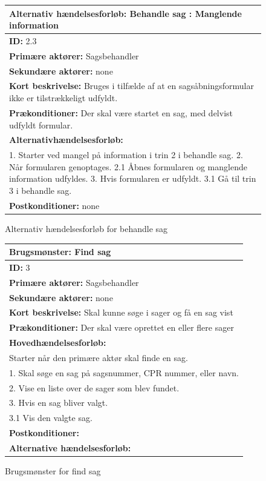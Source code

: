 \begin{figure} [htb!]
\begin{longtable}{|p{18cm}|}
\hline
\textbf{Alternativ hændelsesforløb:} Behandle sag : Manglende information\\
\hline
\textbf{ID:} 2.3 \\
\hline
\textbf{Primære aktører:} Sagsbehandler\\
\hline
\textbf{Sekundære aktører:} none \\
\hline
\textbf{Kort beskrivelse: }Bruges i tilfælde af at en sagsåbningsformular ikke er tilstrækkeligt udfyldt.
\\
\hline
\textbf{Prækonditioner: }Der skal være startet en sag, med delvist udfyldt formular. 
\\
\hline
\textbf{Alternativhændelsesforløb:}\\
1. Starter ved mangel på information i trin 2 i behandle sag.
2. Når formularen genoptages.
2.1 Åbnes formularen og manglende information udfyldes. 
3. Hvis formularen er udfyldt.
3.1 Gå til trin 3 i behandle sag.

\\
\hline
\textbf{Postkonditioner:} none\\
\hline
\end{longtable}
\caption{Alternativ hændelsesforløb for behandle sag}
\label{tab:2.3}
\end{figure}

\begin{figure} [htb!]
\begin{longtable}{|p{18cm}|}
\hline
\textbf{Brugsmønster: }Find sag \\
\hline
\textbf{ID: }3\\
\hline
\textbf{Primære aktører: }Sagsbehandler\\
\hline
\textbf{Sekundære aktører: }none\\
\hline
\textbf{Kort beskrivelse: }Skal kunne søge i sager og få en sag vist\\
\hline
\textbf{Prækonditioner: }Der skal være oprettet en eller flere sager\\
\hline
\textbf{Hovedhændelsesforløb: }\\
Starter når den primære aktør skal finde en sag.\\
1. Skal søge en sag på sagsnummer, CPR nummer, eller navn.\\
2. Vise en liste over de sager som blev fundet.\\
3. Hvis en sag bliver valgt.\\
3.1 Vis den valgte sag.\\
\hline
\textbf{Postkonditioner: }\\
\hline
\textbf{Alternative hændelsesforløb: }\\
\hline
\end{longtable}
\caption{Brugsmønster for find sag}
\label{tab:3}
\end{figure}

